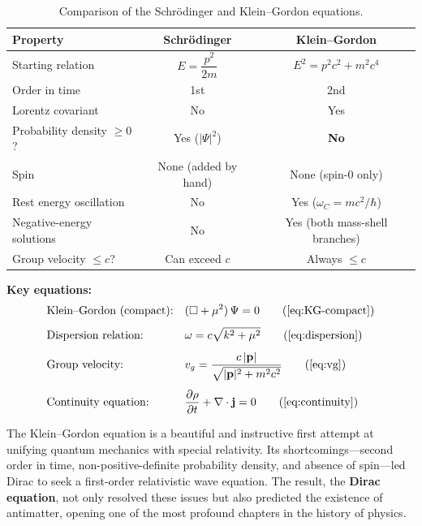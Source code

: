 \documentclass[12pt, a4paper]{article}
\theoremstyle{definition}
\begin{document}
\renewcommand{\arraystretch}{1.4}
\begin{table}[h]
\centering
\caption{Comparison of the Schr\"{o}dinger and Klein--Gordon equations.}
\begin{tabular}{@{}lcc@{}}
\toprule
\textbf{Property}
    & \textbf{Schr\"{o}dinger}
    & \textbf{Klein--Gordon} \\
\midrule
Starting relation
    & $E = \dfrac{p^{2}}{2m}$
    & $E^{2} = p^{2}c^{2}+m^{2}c^{4}$ \\[6pt]
Order in time
    & 1st
    & 2nd \\
Lorentz covariant
    & No
    & Yes \\
Probability density $\geq 0$?
    & Yes ($|\Psi|^{2}$)
    & \textbf{No} \\
Spin
    & None (added by hand)
    & None (spin-0 only) \\
Rest energy oscillation
    & No
    & Yes ($\omega_{C}=mc^{2}/\hbar$) \\
Negative-energy solutions
    & No
    & Yes (both mass-shell branches) \\
Group velocity $\leq c$?
    & Can exceed $c$
    & Always $\leq c$ \\
\bottomrule
\end{tabular}
\end{table}

\noindent\textbf{Key equations:}
\begin{align}
    &\text{Klein--Gordon (compact):}
    &&(\Box + \mu^{2})\,\Psi = 0
    \tag{\ref{eq:KG-compact}} \\[4pt]
    &\text{Dispersion relation:}
    &&\omega = c\sqrt{k^{2}+\mu^{2}}
    \tag{\ref{eq:dispersion}} \\[4pt]
    &\text{Group velocity:}
    &&v_{g} = \frac{c\,|\vb{p}|}{\sqrt{|\vb{p}|^{2}+m^{2}c^{2}}}
    \tag{\ref{eq:vg}} \\[4pt]
    &\text{Continuity equation:}
    &&\frac{\partial\rho}{\partial t}+\nabla\cdot\vb{j}=0
    \tag{\ref{eq:continuity}}
\end{align}

The Klein--Gordon equation is a beautiful and instructive first attempt at
unifying quantum mechanics with special relativity.  Its shortcomings---second
order in time, non-positive-definite probability density, and absence of
spin---led Dirac to seek a first-order relativistic wave equation.  The
result, the \textbf{Dirac equation}, not only resolved these issues but also
predicted the existence of antimatter, opening one of the most profound
chapters in the history of physics.

\end{document}
